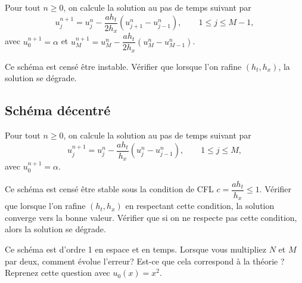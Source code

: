 \documentclass[12pt]{article}
\begin{document}
Pour tout $n \geq 0$, on calcule la solution au pas de temps suivant par
\begin{equation}
  \label{eq:transport_centre}
  u_j^{n+1} = u_j^n - \dfrac{a h_t}{2 h_x} (u_{j+1}^n - u_{j-1}^n) , \qquad 1 \leq j \leq M-1 ,
\end{equation}
avec $u_0^{n+1} = \alpha$ et $u_M^{n+1} = u_M^n - \dfrac{a h_t}{2 h_x} (u_{M}^n - u_{M-1}^n)$.

Ce sch\'ema est cens\'e \^etre instable.
V\'erifier que lorsque l'on rafine $(h_t,h_x)$, la solution se d\'egrade.

\subsection{Sch\'ema d\'ecentr\'e}

Pour tout $n \geq 0$, on calcule la solution au pas de temps suivant par
\begin{equation}
  \label{eq:transport_decentre}
  u_j^{n+1} = u_j^n - \dfrac{a h_t}{h_x} (u_{j}^n - u_{j-1}^n) , \qquad 1 \leq j \leq M ,
\end{equation}
avec $u_0^{n+1} = \alpha$.

Ce sch\'ema est cens\'e \^etre stable sous la condition de CFL $c = \dfrac{a h_t}{h_x} \leq 1$.
V\'erifier que lorsque l'on rafine $(h_t,h_x)$ en respectant cette condition,
la solution converge vers la bonne valeur.
V\'erifier que si on ne respecte pas cette condition, alors la solution se d\'egrade.


Ce sch\'ema est d'ordre 1 en espace et en temps.
Lorsque vous multipliez $N$ et $M$ par deux, comment \'evolue l'erreur?
Est-ce que cela correspond \`a la th\'eorie ?
Reprenez cette question avec $u_0(x) = x^2$.


\end{document}
